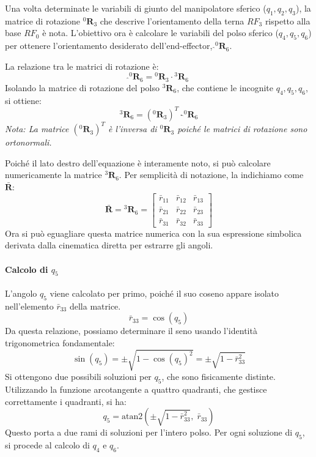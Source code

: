 ﻿\documentclass[11pt, a4paper]{article}
\begin{document}
Una volta determinate le variabili di giunto del manipolatore sferico ($q_1, q_2, q_3$), la matrice di rotazione ${}^{0}\mathbf{R}_{3}$ che descrive l'orientamento della terna \(RF_{3}\) rispetto alla base \(RF_{0}\) è nota. L'obiettivo ora è calcolare le variabili del polso sferico ($q_4, q_5, q_6$) per ottenere l'orientamento desiderato dell'end-effector, $\hat{}^{0}\mathbf{R}_{6}$.

La relazione tra le matrici di rotazione è:
\[
    \hat{}^{0}\mathbf{R}_{6} = {}^{0}\mathbf{R}_{3} \cdot {}^{3}\mathbf{R}_{6}
\]
Isolando la matrice di rotazione del polso ${}^{3}\mathbf{R}_{6}$, che contiene le incognite $q_4, q_5, q_6$, si ottiene:
\[
    {}^{3}\mathbf{R}_{6} = ({}^{0}\mathbf{R}_{3})^{T} \cdot \hat{}^{0}\mathbf{R}_{6}
\]
\textit{Nota: La matrice $({}^{0}\mathbf{R}_{3})^{T}$ è l'inversa di ${}^{0}\mathbf{R}_{3}$ poiché le matrici di rotazione sono ortonormali.}

Poiché il lato destro dell'equazione è interamente noto, si può calcolare numericamente la matrice ${}^{3}\mathbf{R}_{6}$. Per semplicità di notazione, la indichiamo come $\bar{\mathbf{R}}$:
\[
    \bar{\mathbf{R}} = {}^{3}\mathbf{R}_{6} =
    \begin{bmatrix}
        \bar{r}_{11} & \bar{r}_{12} & \bar{r}_{13} \\
        \bar{r}_{21} & \bar{r}_{22} & \bar{r}_{23} \\
        \bar{r}_{31} & \bar{r}_{32} & \bar{r}_{33}
    \end{bmatrix}
\]
Ora si può eguagliare questa matrice numerica con la sua espressione simbolica derivata dalla cinematica diretta per estrarre gli angoli.

\paragraph{Calcolo di \(q_5\)}
L'angolo $q_5$ viene calcolato per primo, poiché il suo coseno appare isolato nell'elemento $\bar{r}_{33}$ della matrice.
\[
    \bar{r}_{33} = \cos(q_5)
\]
Da questa relazione, possiamo determinare il seno usando l'identità trigonometrica fondamentale:
\[
    \sin(q_5) = \pm \sqrt{1 - \cos(q_5)^2} = \pm \sqrt{1 - \bar{r}_{33}^2}
\]
Si ottengono due possibili soluzioni per $q_5$, che sono fisicamente distinte. Utilizzando la funzione arcotangente a quattro quadranti, che gestisce correttamente i quadranti, si ha:
\begin{equation}
    \boxed{q_{5} = \text{atan2}(\pm \sqrt{1 - \bar{r}_{33}^2}, \; \bar{r}_{33})}
\end{equation}
Questo porta a due rami di soluzioni per l'intero polso. Per ogni soluzione di $q_5$, si procede al calcolo di $q_4$ e $q_6$.
\end{document}
